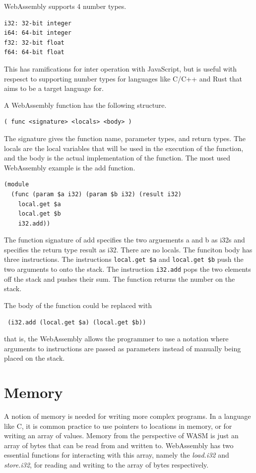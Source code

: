 \documentclass[11pt]{book}
\begin{document}
WebAssembly supports 4 number types.
\begin{verbatim}
i32: 32-bit integer
i64: 64-bit integer
f32: 32-bit float
f64: 64-bit float
\end{verbatim}
This has ramifications for inter operation with JavaScript, but is useful with respesct to supporting number types for languages like C/C++ and Rust that aims to be a target language for. 

A WebAssembly function has the following structure.
\begin{verbatim}
( func <signature> <locals> <body> )
\end{verbatim}
The signature gives the function name, parameter types, and return types. The locals are the local variables that will be used in the execution of the function, and the body is the actual implementation of the function. The most used WebAssembly example is the add function. 

\begin{verbatim}
(module
  (func (param $a i32) (param $b i32) (result i32)
    local.get $a
    local.get $b
    i32.add))
\end{verbatim}

The function signature of add specifies the two arguements a and b as i32s and specifies the return type result as i32. There are no locals. The funciton body has three instructions. The instructions \texttt{local.get \$a} and \texttt{local.get \$b} push the two arguments to onto the stack. The instruction \texttt{i32.add} pops the two elements off the stack and pushes their sum. The function returns the number on the stack. 

The body of the function could be replaced with 
\begin{verbatim}
 (i32.add (local.get $a) (local.get $b))
\end{verbatim}
that is, the WebAssembly allows the programmer to use a notation where arguments to instructions are passed as parameters instead of manually being placed on the stack.



\section{Memory}

A notion of memory is needed for writing more complex programs. In a language like C, it is common practice to use pointers to locations in memory, or for writing an array of values. Memory from the perspective of WASM is just an array of bytes that can be read from and written to. WebAssembly has two essential functions for interacting with this array, namely the \textit{load.i32} and \textit{store.i32}, for reading and writing to the array of bytes respectively.
\end{document}
